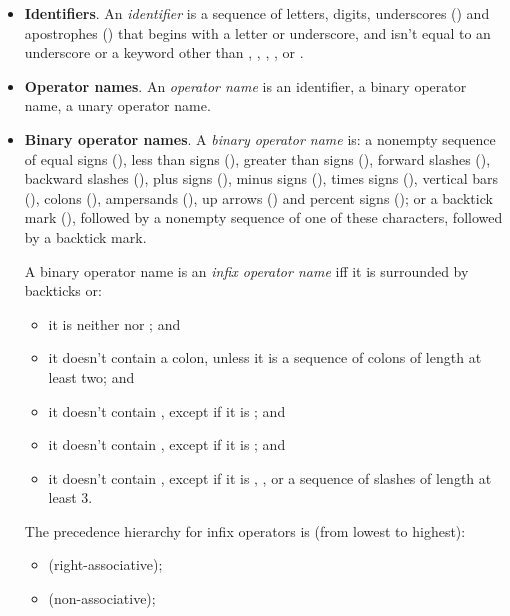 \begin{itemize}
\item \textbf{Identifiers}. An \emph{identifier} is a sequence of
  letters, digits, underscores (\ecnocolors{_}) and apostrophes
  () that begins with a letter or underscore, and isn't
  equal to an underscore or a keyword other than ,
  , , ,
   or .

\item \textbf{Operator names}. An \emph{operator name} is an
  identifier, a binary operator name, a unary operator name.

\item \textbf{Binary operator names}. A \emph{binary operator name}
  is: a nonempty sequence of equal signs (\ec{=}), less
  than signs (\ec{<}), greater than signs (\ec{>}), forward slashes
  (\ec{/}), backward slashes (\ec{\\}), plus signs (\ec{+}), minus
  signs (\ec{-}), times signs (\ec{*}), vertical bars (\ec{|}), colons
  (\ec{:}), ampersands (\ec{&}), up arrows (\ec{^}) and percent signs
  (\ec{\%}); or a backtick mark (), followed by a nonempty sequence
  of one of these characters, followed by a backtick mark.

  A binary operator name is an \emph{infix operator name} iff it is surrounded
  by backticks or:
  \begin{itemize}
  \item it is neither \ecnocolors{<<} nor \ecnocolors{>>}; and
  \item it doesn't contain a colon, unless it is a sequence of colons
    of length at least two; and
  \item it doesn't contain \ecnocolors{=>}, except if it is \ecnocolors{=>}; and
  \item it doesn't contain \ecnocolors{|}, except if it is \ecnocolors{||}; and
  \item it doesn't contain \ecnocolors{/}, except if it is \ecnocolors{/},
    \ecnocolors{/\\}, or a sequence of slashes of length at least 3.
  \end{itemize}

  The precedence hierarchy for infix operators is (from lowest to highest):
  \begin{itemize}
  \item \ecnocolors{=>} (right-associative);

  \item \ecnocolors{<=>} (non-associative);


\end{itemize}
\end{itemize}
